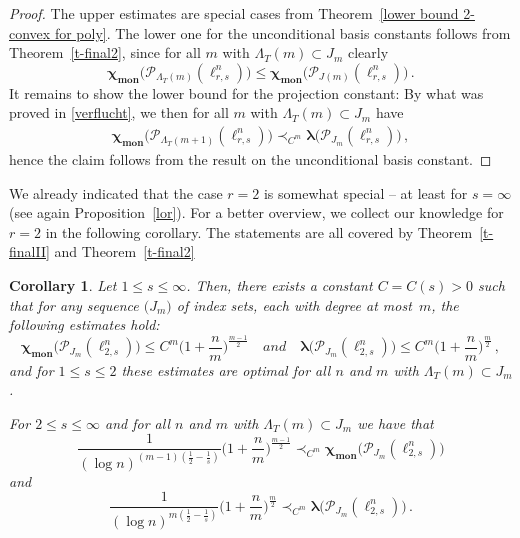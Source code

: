 \documentclass[12pt]{amsart}
\numberwithin{subsection}{section}
\newtheorem{corollary}[theorem]{Corollary}
\theoremstyle{definition}
\theoremstyle{remark}
\DeclareMathOperator{\mon}{mon}
\newcommand{\chimon}{\chi_{\mon}}
\begin{document}
\begin{proof}
The upper estimates are special cases  from Theorem~\ref{lower bound 2-convex for poly}. The lower one for the unconditional
basis constants follows from Theorem~\ref{t-final2}, since for all $m $ with $\Lambda_T(m) \subset J_m$ clearly
\[
\boldsymbol{\chimon}\big( \mathcal{P}_{\Lambda_T(m)}(\ell_{r,s}^n)\big)
\leq
\boldsymbol{\chimon} \big(\mathcal{P}_{J(m)} (\ell_{r,s}^n) \big)\,.
\]
 It remains to show the lower bound for the projection constant: By what was proved
in \eqref{verflucht}, we then for all $m$ with $\Lambda_T(m) \subset J_m$ have
\begin{align*}
\boldsymbol{\chimon}\big( \mathcal{P}_{\Lambda_T(m+1)}(\ell_{r,s}^n)\big)
\prec_{C^m}  \boldsymbol{\lambda}\big( \mathcal{P}_{J_m}(\ell_{r,s}^n)\big)\,,
\end{align*}
hence the claim  follows from the result on the unconditional basis constant.
\end{proof}



We already indicated that the case $r=2$ is somewhat special -- at least for $s = \infty$ (see again Proposition~\ref{lor}).
For a better overview, we collect our knowledge for $r=2$ in the following corollary. The statements are all covered by
Theorem~\ref{t-finalII} and Theorem~\ref{t-final2}


\begin{corollary}\label{thm: proy + uncon l2,s}
Let $1 \leq s \leq \infty$. Then, there exists a constant $C=C(s)>0$ such that for any sequence $\big(J_m\big)$ of index sets,
each with degree at most~$m$, the following estimates hold{\rm:}
\[
\boldsymbol{\chimon}\big(\mathcal{P}_{J_m}(\ell_{2,s}^n)\big)  \leq C^m\Big(1+ \frac{n}{m}\Big)^{\frac{m-1}{2}}
\quad and \quad
\boldsymbol{\lambda}\big(\mathcal{P}_{J_m}(\ell_{2,s}^n)\big)  \leq C^m\Big( 1+\frac{n}{m}\Big)^{\frac{m}{2}}\,,
\]
and for $1 \leq s \leq 2$ these estimates  are optimal for all $n$ and $m$ with $\Lambda_T(m) \subset J_m$.

For $2 \leq s \leq \infty$ and for all $n$ and $m$ with $\Lambda_T(m) \subset J_m$ we have that
\[
\frac{1}{(\log n)^{(m-1)(\frac{1}{2}-\frac{1}{s}) }}
\Big( 1+\frac{n}{m} \Big)^{\frac{m-1}{2}}
\prec_{C^m}
\boldsymbol{\chimon}\big(\mathcal{P}_{J_m}(\ell^n_{2,s})\big)
\]
and
\begin{equation} \label{april7} \frac{1}{(\log n)^{m(\frac{1}{2}-\frac{1}{s}) }} \Big( 1+\frac{n}{m} \Big)^{\frac{m}{2}}
\prec_{C^m} \boldsymbol{\lambda}\big(\mathcal{P}_{J_m}(\ell^n_{2,s})\big)\,.
\end{equation}
\end{corollary}
\end{document}
